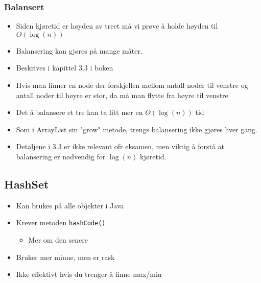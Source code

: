 \documentclass{article}
\begin{document}
    \subsubsection{Balansert}
    \begin{itemize}
        \item Siden kjøretid er høyden av treet må vi prøve å holde høyden til \( O\left( \log\left( n \right) \right) \)
        \item Balansering kan gjøres på mange måter.
        \item Beskrives i kapittel 3.3 i boken
        \item Hvis man finner en node der forskjellen mellom antall noder til venstre og antall noder til høyre er stor, da må man flytte fra høyre til venstre
        \item Det å balansere et tre kan ta litt mer en \( O\left( \log\left( n \right) \right) \) tid
        \item Som i ArrayList sin "grow" metode, trengs balansering ikke gjøres hver gang.
        \item Detaljene i 3.3 er ikke relevant ofr eksamen, men viktig å forstå at balansering er nødvendig for \( \log\left( n \right) \) kjøretid.
    \end{itemize}

    \subsection{HashSet}

    \begin{itemize}
        \item Kan brukes på alle objekter i Java
        \item Krever metoden \texttt{hashCode()}
            \begin{itemize}
                \item Mer om den senere
            \end{itemize}
        \item Bruker mer minne, men er rask
        \item Ikke effektivt hvis du trenger å finne max/min
    \end{itemize}
\end{document}
